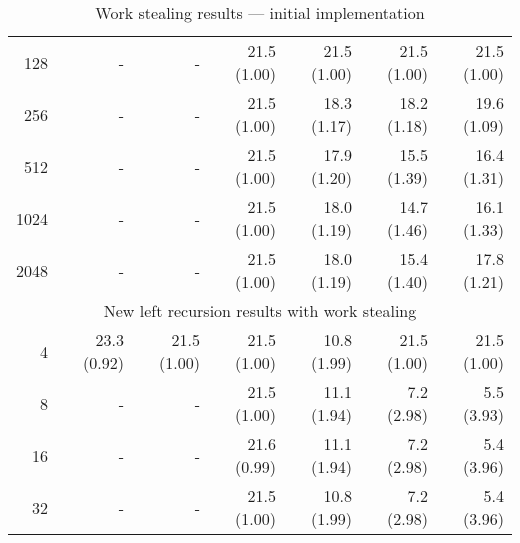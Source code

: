 \begin{table}
\begin{center}
\begin{tabular}{r|rr|rrrr}
128  &-&-& 21.5 (1.00) & 21.5 (1.00) & 21.5 (1.00) & 21.5 (1.00) \\
256  &-&-& 21.5 (1.00) & 18.3 (1.17) & 18.2 (1.18) & 19.6 (1.09) \\
512  &-&-& 21.5 (1.00) & 17.9 (1.20) & 15.5 (1.39) & 16.4 (1.31) \\
1024 &-&-& 21.5 (1.00) & 18.0 (1.19) & 14.7 (1.46) & 16.1 (1.33) \\
2048 &-&-& 21.5 (1.00) & 18.0 (1.19) & 15.4 (1.40) & 17.8 (1.21) \\
\hline
\hline
\multicolumn{7}{c}{New left recursion results with work stealing} \\
\hline
4        & 23.3 (0.92) & 21.5 (1.00)
         & 21.5 (1.00) & 10.8 (1.99) & 21.5 (1.00) & 21.5 (1.00) \\
8    &-&-& 21.5 (1.00) & 11.1 (1.94) &  7.2 (2.98) &  5.5 (3.93) \\
16   &-&-& 21.6 (0.99) & 11.1 (1.94) &  7.2 (2.98) &  5.4 (3.96) \\
32   &-&-& 21.5 (1.00) & 10.8 (1.99) &  7.2 (2.98) &  5.4 (3.96) \\
\end{tabular}
\end{center}
\caption{Work stealing results --- initial implementation}
\label{tab:work_stealing_initial}
\end{table}

